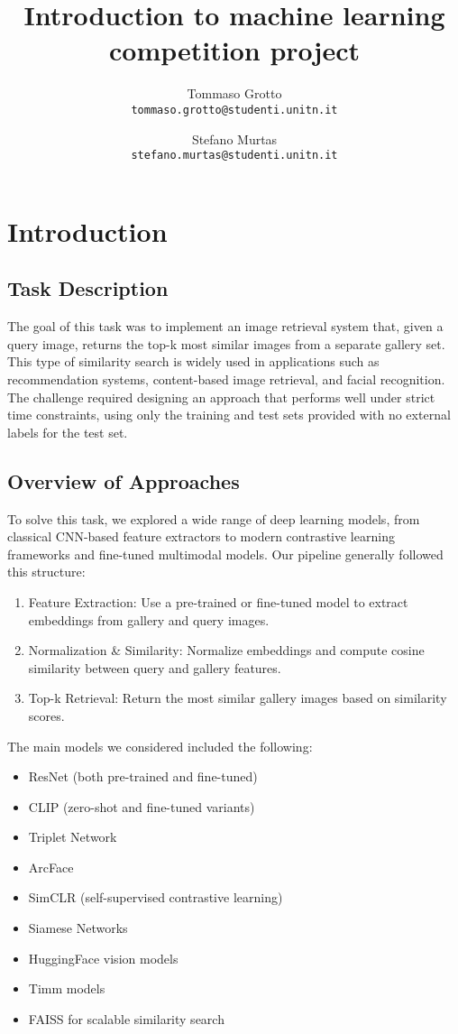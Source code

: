 \documentclass[10pt,twocolumn,letterpaper]{article}
\title{Introduction to machine learning competition project}
\author{Tommaso Grotto\\\texttt{tommaso.grotto@studenti.unitn.it}\\\and Stefano Murtas\\\texttt{stefano.murtas@studenti.unitn.it}}
\begin{document}
\maketitle

\section{Introduction}
\subsection{Task Description}
The goal of this task was to implement an image retrieval system that, given a query image, returns the top-k most similar images from a separate gallery set. This type of similarity search is widely used in applications such as recommendation systems, content-based image retrieval, and facial recognition. The challenge required designing an approach that performs well under strict time constraints, using only the training and test sets provided with no external labels for the test set.

\subsection{Overview of Approaches}
To solve this task, we explored a wide range of deep learning models, from classical CNN-based feature extractors to modern contrastive learning frameworks and fine-tuned multimodal models. Our pipeline generally followed this structure:

\begin{enumerate}
  \item Feature Extraction: Use a pre-trained or fine-tuned model to extract embeddings from gallery and query images.
  \item Normalization \& Similarity: Normalize embeddings and compute cosine similarity between query and gallery features.
  \item Top-k Retrieval: Return the most similar gallery images based on similarity scores.
\end{enumerate}

The main models we considered included the following:
\begin{itemize}
  \item ResNet (both pre-trained and fine-tuned)
  \item CLIP (zero-shot and fine-tuned variants)
  \item Triplet Network
  \item ArcFace
  \item SimCLR (self-supervised contrastive learning)
  \item Siamese Networks
  \item HuggingFace vision models
  \item Timm models
  \item FAISS for scalable similarity search
\end{itemize}
\end{document}
